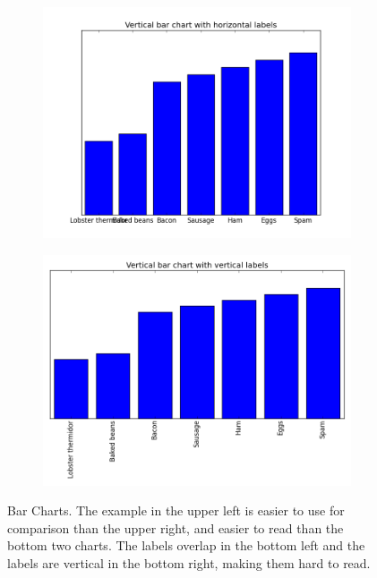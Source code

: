 \begin{figure}[h]
\begin{subfigure}{.45\textwidth}
  \includegraphics[width=\textwidth]{bar_chart_vertical_bars_horizontal_labels.png}
\end{subfigure}
\begin{subfigure}{.45\textwidth}
  \centering
  \includegraphics[width=\textwidth]{bar_chart_vertical_bars_vertical_labels.png}
\end{subfigure}

\caption{Bar Charts.
The example in the upper left is easier to use for comparison than the upper right, and easier to read than the bottom two charts.
The labels overlap in the bottom left and the labels are vertical in the bottom right, making them hard to read.}
\label{fig:barchart}
\end{figure}

